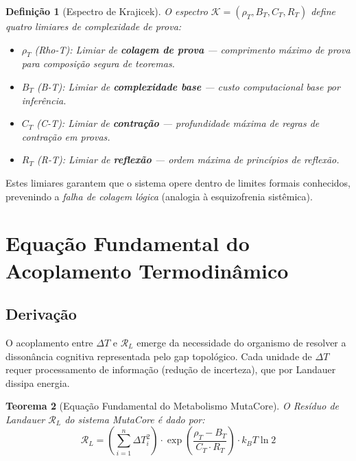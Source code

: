 \documentclass[11pt,a4paper]{article}
\newtheorem{theorem}{Teorema}[section]
\newtheorem{definition}[theorem]{Definição}
\newcommand{\rhoT}{\rho_T}
\newcommand{\BT}{B_T}
\newcommand{\CT}{C_T}
\newcommand{\RT}{R_T}
\newcommand{\DeltaT}{\Delta T}
\newcommand{\RL}{\mathcal{R}_L}
\newcommand{\kB}{k_B}
\begin{document}
\begin{definition}[Espectro de Krajicek]
O espectro $\mathcal{K} = (\rhoT, \BT, \CT, \RT)$ define quatro limiares de complexidade de prova:
\begin{itemize}
    \item $\rhoT$ (Rho-T): Limiar de \textbf{colagem de prova} — comprimento máximo de prova para composição segura de teoremas.
    \item $\BT$ (B-T): Limiar de \textbf{complexidade base} — custo computacional base por inferência.
    \item $\CT$ (C-T): Limiar de \textbf{contração} — profundidade máxima de regras de contração em provas.
    \item $\RT$ (R-T): Limiar de \textbf{reflexão} — ordem máxima de princípios de reflexão.
\end{itemize}
\end{definition}

Estes limiares garantem que o sistema opere dentro de limites formais conhecidos, prevenindo a \textit{falha de colagem lógica} (analogia à esquizofrenia sistêmica).

\section{Equação Fundamental do Acoplamento Termodinâmico}

\subsection{Derivação}

O acoplamento entre $\DeltaT$ e $\RL$ emerge da necessidade do organismo de resolver a dissonância cognitiva representada pelo gap topológico. Cada unidade de $\DeltaT$ requer processamento de informação (redução de incerteza), que por Landauer dissipa energia.

\begin{theorem}[Equação Fundamental do Metabolismo MutaCore]
O Resíduo de Landauer $\RL$ do sistema MutaCore é dado por:
\begin{equation}
    \boxed{
    \RL = \left( \sum_{i=1}^{n} \DeltaT_i^2 \right) \cdot
    \exp\left( \frac{\rhoT - \BT}{\CT \cdot \RT} \right) \cdot
    \kB T \ln 2
    }
    \label{eq:fundamental}
\end{equation}
\end{theorem}
\end{document}

